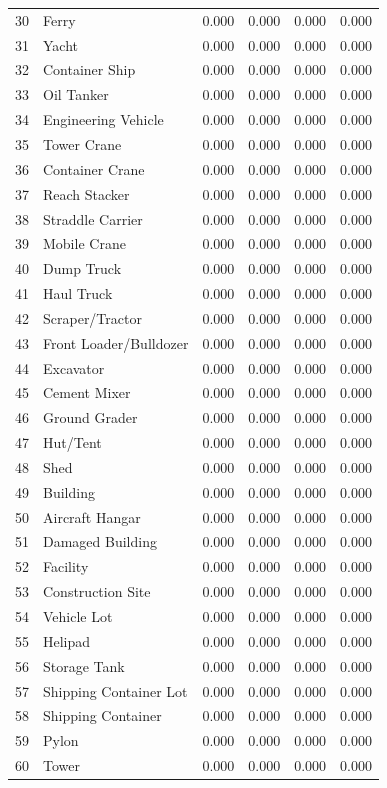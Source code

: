 \begin{center}
\begin{longtable}{|c|l|c|c|c|c|}
30 & Ferry & 0.000 & 0.000 & 0.000 & 0.000\\
31 & Yacht & 0.000 & 0.000 & 0.000 & 0.000\\
32 & Container Ship & 0.000 & 0.000 & 0.000 & 0.000\\
33 & Oil Tanker & 0.000 & 0.000 & 0.000 & 0.000\\
34 & Engineering Vehicle & 0.000 & 0.000 & 0.000 & 0.000\\
35 & Tower Crane & 0.000 & 0.000 & 0.000 & 0.000\\
36 & Container Crane & 0.000 & 0.000 & 0.000 & 0.000\\
37 & Reach Stacker & 0.000 & 0.000 & 0.000 & 0.000\\
38 & Straddle Carrier & 0.000 & 0.000 & 0.000 & 0.000\\
39 & Mobile Crane & 0.000 & 0.000 & 0.000 & 0.000\\
40 & Dump Truck & 0.000 & 0.000 & 0.000 & 0.000\\
41 & Haul Truck & 0.000 & 0.000 & 0.000 & 0.000\\
42 & Scraper/Tractor & 0.000 & 0.000 & 0.000 & 0.000\\
43 & Front Loader/Bulldozer & 0.000 & 0.000 & 0.000 & 0.000\\
44 & Excavator & 0.000 & 0.000 & 0.000 & 0.000\\
45 & Cement Mixer & 0.000 & 0.000 & 0.000 & 0.000\\
46 & Ground Grader & 0.000 & 0.000 & 0.000 & 0.000\\
47 & Hut/Tent & 0.000 & 0.000 & 0.000 & 0.000\\
48 & Shed & 0.000 & 0.000 & 0.000 & 0.000\\
49 & Building & 0.000 & 0.000 & 0.000 & 0.000\\
50 & Aircraft Hangar & 0.000 & 0.000 & 0.000 & 0.000\\
51 & Damaged Building & 0.000 & 0.000 & 0.000 & 0.000\\
52 & Facility & 0.000 & 0.000 & 0.000 & 0.000\\
53 & Construction Site & 0.000 & 0.000 & 0.000 & 0.000\\
54 & Vehicle Lot & 0.000 & 0.000 & 0.000 & 0.000\\
55 & Helipad & 0.000 & 0.000 & 0.000 & 0.000\\
56 & Storage Tank & 0.000 & 0.000 & 0.000 & 0.000\\
57 & Shipping Container Lot & 0.000 & 0.000 & 0.000 & 0.000\\
58 & Shipping Container & 0.000 & 0.000 & 0.000 & 0.000\\
59 & Pylon & 0.000 & 0.000 & 0.000 & 0.000\\
60 & Tower & 0.000 & 0.000 & 0.000 & 0.000\\
\end{longtable}
\end{center}

